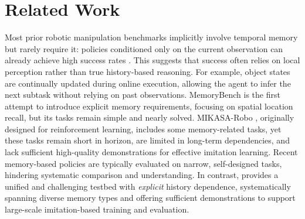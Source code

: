 


\section{Related Work}

Most prior robotic manipulation benchmarks \cite{liu2023libero, li24simpler, mees2022calvin, zhu2020robosuite} implicitly involve temporal memory but rarely require it: policies conditioned only on the current observation can already achieve high success rates \cite{pi05, wang2025vlaadaptor, dai2025aimbot}. This suggests that success often relies on local perception rather than true history-based reasoning. For example, object states are continually updated during online execution, allowing the agent to infer the next subtask without relying on past observations.
MemoryBench \cite{fang2025sam2act} is the first attempt to introduce explicit memory requirements, focusing on spatial location recall, but its tasks remain simple and nearly solved. MIKASA-Robo \cite{cherepanov2025memory}, originally designed for reinforcement learning, includes some memory-related tasks, yet these tasks remain short in horizon, are limited in long-term dependencies, and lack sufficient high-quality demonstrations for effective imitation learning.
Recent memory-based policies \cite{shi2025memoryvla, sridhar2025memer} are typically evaluated on narrow, self-designed tasks, hindering systematic comparison and understanding. 
In contrast, \benchname\xspace provides a unified and challenging testbed with \emph{explicit} history dependence, systematically spanning diverse memory types and offering sufficient demonstrations to support large-scale imitation-based training and evaluation.

